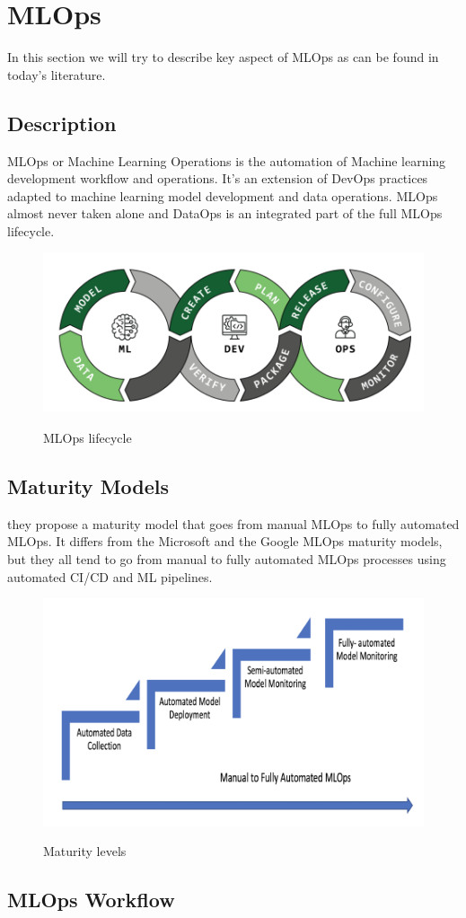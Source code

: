 \section{MLOps}\label{sec:mlops}

In this section we will try to describe key aspect of MLOps as can be found in today's literature.

\subsection{Description}\label{subsec:description}
MLOps or Machine Learning Operations is the automation of Machine learning development workflow and operations.
It's an extension of DevOps practices adapted to machine learning model development and data operations.
MLOps almost never taken alone and DataOps is an integrated part of the full MLOps lifecycle.

\begin{figure}[!htbp]
    \caption{MLOps lifecycle \cite{mlops-definition-tools-and-challenge}}
    \centering
    \includegraphics[scale=0.5]{images/ml-dev-ops}
    \label{fig:ml-dev-ops}
\end{figure}

\subsection{Maturity Models}\label{subsec:maturity-models}
\cite{mlops-maturity-model} they propose a maturity model that goes from manual MLOps to fully automated MLOps.
It differs from the Microsoft and the Google MLOps maturity models,
but they all tend to go from manual to fully automated MLOps processes using automated CI/CD and
ML pipelines.\cite{mlops-definition-tools-and-challenge}

\begin{figure}[!htbp]
    \caption{Maturity levels \cite{mlops-maturity-model}}
    \centering
    \includegraphics[scale=0.5]{images/maturity-levels}
    \label{fig:maturity}
\end{figure}

\subsection{MLOps Workflow}\label{subsec:mlops-workflow}